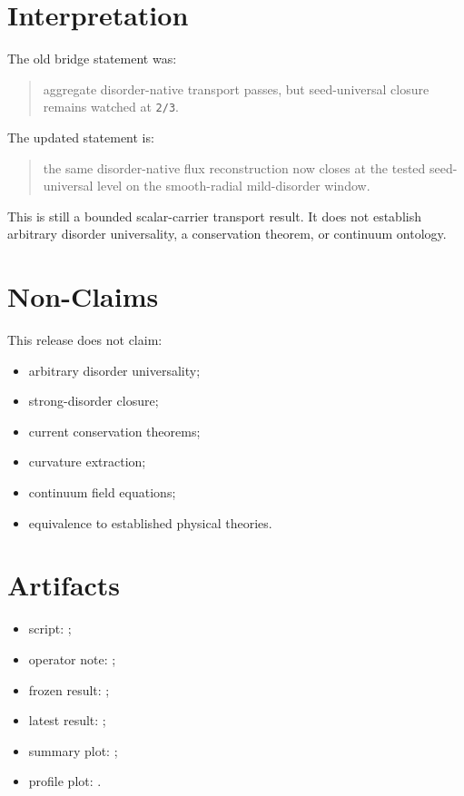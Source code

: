 \documentclass[11pt]{article}
\begin{document}
\section{Interpretation}

The old bridge statement was:
\begin{quote}
aggregate disorder-native transport passes, but seed-universal closure remains watched at \texttt{2/3}.
\end{quote}

The updated statement is:
\begin{quote}
the same disorder-native flux reconstruction now closes at the tested seed-universal level on the smooth-radial mild-disorder window.
\end{quote}

This is still a bounded scalar-carrier transport result. It does not establish arbitrary disorder universality, a conservation theorem, or continuum ontology.

\section{Non-Claims}

This release does not claim:
\begin{itemize}
\item arbitrary disorder universality;
\item strong-disorder closure;
\item current conservation theorems;
\item curvature extraction;
\item continuum field equations;
\item equivalence to established physical theories.
\end{itemize}

\section{Artifacts}

\begin{itemize}
\item script: ;
\item operator note: ;
\item frozen result: ;
\item latest result: ;
\item summary plot: ;
\item profile plot: .
\end{itemize}
\end{document}
